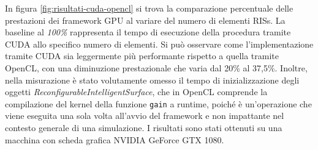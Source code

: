In figura \ref{fig:risultati-cuda-opencl} si trova la comparazione percentuale
delle prestazioni dei framework GPU al variare del numero di elementi RISs. La baseline
al \textit{100\%} rappresenta il tempo di esecuzione della procedura tramite
CUDA allo specifico numero di elementi. Si può osservare come l'implementazione tramite
CUDA sia leggermente più performante rispetto a quella tramite OpenCL, con una
diminuzione prestazionale che varia dal 20\% al 37,5\%. Inoltre, nella
misurazione è stato volutamente omesso il tempo di inizializzazione degli
oggetti \textit{ReconfigurableIntelligentSurface}, che in OpenCL comprende la
compilazione del kernel della funzione \texttt{gain} a runtime, poiché è un'operazione
che viene eseguita una sola volta all'avvio del framework e non impattante nel
contesto generale di una simulazione. I risultati sono stati ottenuti su una macchina
con scheda grafica NVIDIA GeForce GTX 1080.

